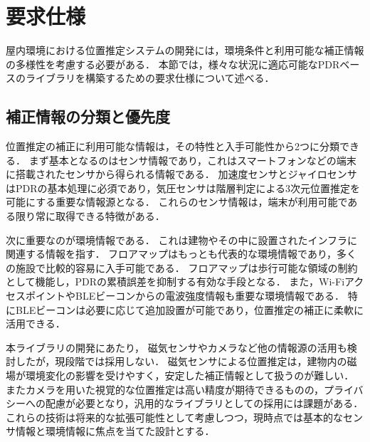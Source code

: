



\section{要求仕様}

屋内環境における位置推定システムの開発には，環境条件と利用可能な補正情報の多様性を考慮する必要がある．
本節では，様々な状況に適応可能なPDRベースのライブラリを構築するための要求仕様について述べる．


\subsection{補正情報の分類と優先度}

位置推定の補正に利用可能な情報は，その特性と入手可能性から2つに分類できる．
まず基本となるのはセンサ情報であり，これはスマートフォンなどの端末に搭載されたセンサから得られる情報である．
加速度センサとジャイロセンサはPDRの基本処理に必須であり，気圧センサは階層判定による3次元位置推定を可能にする重要な情報源となる．
これらのセンサ情報は，端末が利用可能である限り常に取得できる特徴がある．

次に重要なのが環境情報である．
これは建物やその中に設置されたインフラに関連する情報を指す．
フロアマップはもっとも代表的な環境情報であり，多くの施設で比較的容易に入手可能である．
フロアマップは歩行可能な領域の制約として機能し，PDRの累積誤差を抑制する有効な手段となる．
また，Wi-FiアクセスポイントやBLEビーコンからの電波強度情報も重要な環境情報である．
特にBLEビーコンは必要に応じて追加設置が可能であり，位置推定の補正に柔軟に活用できる．

本ライブラリの開発にあたり，
磁気センサやカメラなど他の情報源の活用も検討したが，現段階では採用しない．
磁気センサによる位置推定は，建物内の磁場が環境変化の影響を受けやすく，安定した補正情報として扱うのが難しい．
またカメラを用いた視覚的な位置推定は高い精度が期待できるものの，プライバシーへの配慮が必要となり，汎用的なライブラリとしての採用には課題がある．
これらの技術は将来的な拡張可能性として考慮しつつ，現時点では基本的なセンサ情報と環境情報に焦点を当てた設計とする．

